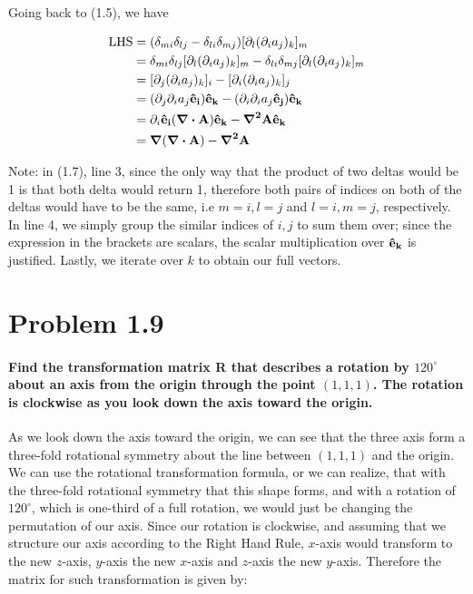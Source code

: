 \documentclass{article}
\numberwithin{equation}{section}
\begin{document}
Going back to (1.5), we have

\begin{equation}
    \begin{split}
        \text{LHS} &=  (\delta_{mi} \delta_{lj} - \delta_{li} \delta_{mj} ) \lbrack \partial_l (\partial_i a_j)_k \rbrack_m \\
        &= \delta_{mi} \delta_{lj} \lbrack \partial_l (\partial_i a_j)_k \rbrack_m - \delta_{li} \delta_{mj} \lbrack \partial_l (\partial_i a_j)_k \rbrack_m \\
        &= \lbrack \partial_j (\partial_i a_j)_k \rbrack_i -  \lbrack \partial_i (\partial_i a_j)_k \rbrack_j \\
        &=  (\partial_j \partial_i a_j \vb{\hat{e}_i) \hat{e}_k} -  (\partial_i \partial_i a_j \vb{\hat{e}_j}) \vb{\hat{e}_k} \\
        &= \partial_i \vb{\hat{e}_i (\div A) \hat{e}_k - \grad^2 A \hat{e}_k} \\ 
        &= \vb{\grad (\div A) - \grad^2 A}
    \end{split}
\end{equation}

Note: in (1.7), line 3, since the only way that the product of two deltas would be 1 is that both delta would return 1, therefore both pairs of indices on both of the deltas would have to be the same, i.e $m = i, l = j$ and $l = i, m = j$, respectively. In line 4, we simply group the similar indices of $i, j$ to sum them over; since the expression in the brackets are scalars, the scalar multiplication over $\vb{\hat{e}_k}$ is justified. Lastly, we iterate over $k$ to obtain our full vectors.

\section{Problem 1.9}

\paragraph{Find the transformation matrix R that describes a rotation by $120^\circ$ about an axis from the origin through the point $(1, 1, 1)$. The rotation is clockwise as you look down the axis toward the origin. \\}

As we look down the axis toward the origin, we can see that the three axis form a three-fold rotational symmetry about the line between $(1,1,1)$ and the origin. We can use the rotational transformation formula, or we can realize, that with the three-fold rotational symmetry that this shape forms, and with a rotation of $120^\circ$, which is one-third of a full rotation, we would just be changing the permutation of our axis. Since our rotation is clockwise, and assuming that we structure our axis according to the Right Hand Rule, $x$-axis would transform to the new $z$-axis, $y$-axis the new $x$-axis and $z$-axis the new $y$-axis. Therefore the matrix for such transformation is given by:
\end{document}

